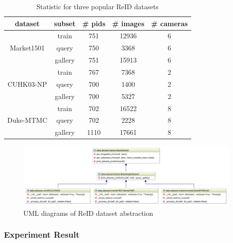 \begin{table}
    \begin{center}
        \begin{tabular}{||c c c c c||}
            \hline
            dataset & subset & \# pids & \# images & \# cameras \\ [0.5ex]
            \hline\hline
            \multirow{3}{4em}{{\tiny Market1501}} & train & 751 & 12936 & 6 \\
            & query & 750 & 3368 & 6 \\
            & gallery & 751 & 15913 & 6 \\
            \hline
            \multirow{3}{4em}{{\tiny CUHK03-NP}} & train & 767 & 7368 & 2 \\
            & query & 700 & 1400 & 2 \\
            & gallery & 700 & 5327 & 2 \\
            \hline
            \multirow{3}{4em}{{\tiny Duke-MTMC}} & train & 702 & 16522 & 8 \\
            & query & 702 & 2228 & 8 \\
            & gallery & 1110 & 17661 & 8 \\
            \hline
        \end{tabular}
    \end{center}
    \caption{Statistic for three popular ReID datasets}
    \label{tab:reid-dataset}
\end{table}

\begin{figure}
    \includegraphics[width=\linewidth]{figures/framework_reid_dataset_uml.png}
    \caption{UML diagrams of ReID dataset abstraction}
    \label{fig:fw-reid-dataset-uml}
\end{figure}

\subsubsection{Experiment Result}
\label{sec:Eval-reid-result}


